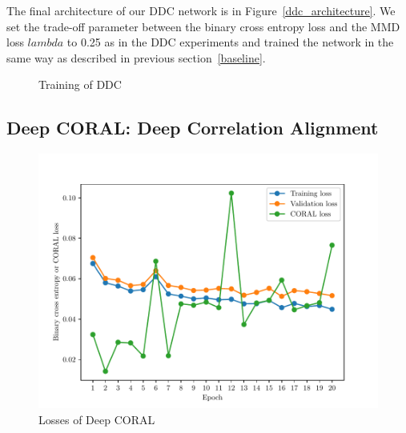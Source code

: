 The final architecture of our DDC network is in Figure~\ref{ddc_architecture}. We set the trade-off parameter between the binary cross entropy loss and the MMD loss \(lambda\) to 0.25 as in the DDC experiments
and trained the network in the same way
as described in previous section~\ref{baseline}.

\begin{figure}
	\caption{Training of DDC}
	\label{ddc_training}
\end{figure}

\subsection{Deep CORAL: Deep Correlation Alignment}

\begin{figure}
	\includegraphics[width=\textwidth]{img/deep-coral_losses.pdf}
	\caption{Losses of Deep CORAL}
	\label{deep_coral_losses}
\end{figure}


